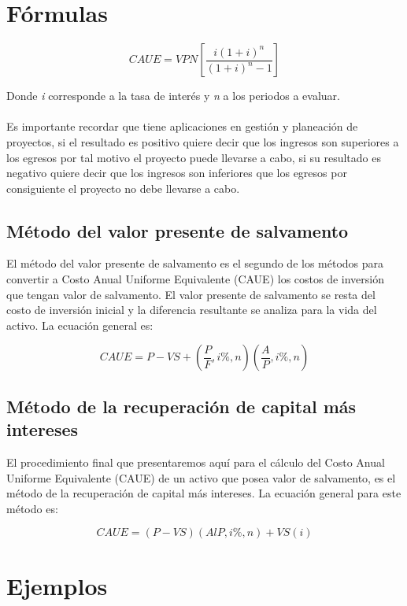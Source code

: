 \newpage
\section{Fórmulas}

\begin{center}
	\begin{LARGE}
		\textbf{\[CAUE = VPN\left[ \frac{i(1+i)^n}{(1+i)^n-1}\right]\]}
	\end{LARGE}
\end{center}

Donde \textit{i} corresponde a la tasa de interés y \textit{n} a los periodos a evaluar.
\\\\
Es importante recordar que tiene aplicaciones en gestión y planeación de proyectos, si el resultado es positivo quiere decir que los ingresos son superiores a los egresos por tal motivo el proyecto puede llevarse a cabo, si su resultado es negativo quiere decir que los ingresos son inferiores que los egresos por consiguiente el proyecto no debe llevarse a cabo.

\subsection{Método del valor presente de salvamento}
El método del valor presente de salvamento es el segundo de los métodos para convertir a Costo Anual Uniforme Equivalente (CAUE) los costos de inversión que tengan valor de salvamento. El valor presente de salvamento se resta del costo de inversión inicial y la diferencia resultante se analiza para la vida del activo. La ecuación general es:
\begin{center}
	\begin{LARGE}
		\textbf{\[CAUE = P-VS+\left( \frac{P}{F}, i\%, n\right) \left( \frac{A}{P}, i\%, n\right) \]}
	\end{LARGE}
\end{center}

\subsection{Método de la recuperación de capital más intereses}
El procedimiento final que presentaremos aquí para el cálculo del Costo Anual Uniforme Equivalente (CAUE) de un activo que posea valor de salvamento, es el método de la recuperación de capital más intereses. La ecuación general para este método es:
\begin{center}
	\begin{LARGE}
		\textbf{\[CAUE = (P - VS) (AlP, i\%, n) + VS(i)\]}
	\end{LARGE}
\end{center}

\section{Ejemplos}






